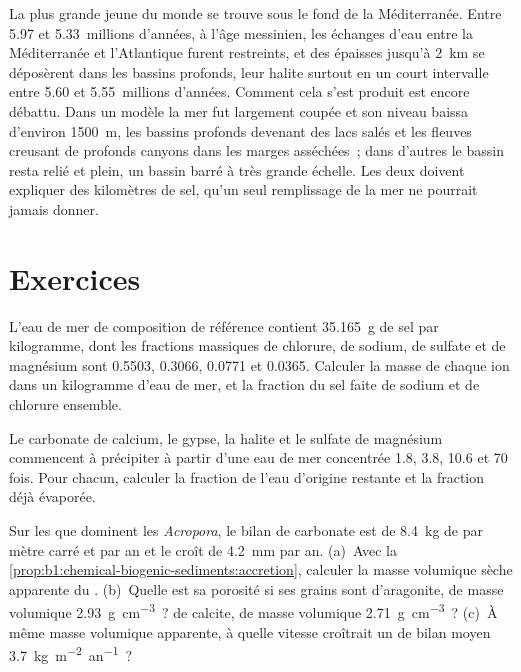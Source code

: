 La plus grande  jeune du monde se trouve sous le fond de la
Méditerranée. Entre 5.97 et 5.33~millions d'années, à l'âge messinien, les
échanges d'eau entre la Méditerranée et l'Atlantique furent restreints,
et des  épaisses jusqu'à \qty{2}{km} se déposèrent dans les bassins profonds, leur
halite surtout en un court intervalle entre 5.60 et 5.55~millions d'années. Comment
cela s'est produit est encore débattu. Dans un modèle la mer fut largement coupée et son
niveau baissa d'environ \qty{1500}{m}, les bassins profonds devenant des lacs salés et les
fleuves creusant de profonds canyons dans les marges asséchées~; dans d'autres le bassin resta
relié et plein, un bassin barré à très grande échelle. Les deux doivent expliquer
des kilomètres de sel, qu'un seul remplissage de la mer ne pourrait jamais donner.

\section{Exercices}

\begin{exercise}[$\star$]\label{exo:b1:chemical-biogenic-sediments:1}
L'eau de mer de composition de référence contient \qty{35.165}{g} de sel par
kilogramme, dont les fractions massiques de chlorure, de sodium, de sulfate et de magnésium
sont 0.5503, 0.3066, 0.0771 et 0.0365. Calculer la masse de chaque ion dans un kilogramme
d'eau de mer, et la fraction du sel faite de sodium et de chlorure ensemble.
\end{exercise}

\begin{exercise}[$\star$]\label{exo:b1:chemical-biogenic-sediments:2}
Le carbonate de calcium, le gypse, la halite et le sulfate de magnésium commencent à précipiter
à partir d'une eau de mer concentrée 1.8, 3.8, 10.6 et 70 fois. Pour chacun, calculer la
fraction de l'eau d'origine restante et la fraction déjà évaporée.
\end{exercise}

\begin{exercise}[$\star$]\label{exo:b1:chemical-biogenic-sediments:3}
Sur les  que dominent les \emph{Acropora}, le bilan de carbonate est de \qty{8.4}{kg} de
 par mètre carré et par an et le  croît de \qty{4.2}{mm} par
an. (a)~Avec la \cref{prop:b1:chemical-biogenic-sediments:accretion}, calculer la
masse volumique sèche apparente du . (b)~Quelle est sa porosité si ses grains sont
d'aragonite, de masse volumique \qty{2.93}{g.cm^{-3}}~? de calcite, de masse volumique
\qty{2.71}{g.cm^{-3}}~? (c)~À même masse volumique apparente, à quelle vitesse croîtrait un  de
bilan moyen \qty{3.7}{kg.m^{-2}.an^{-1}}~?
\end{exercise}

